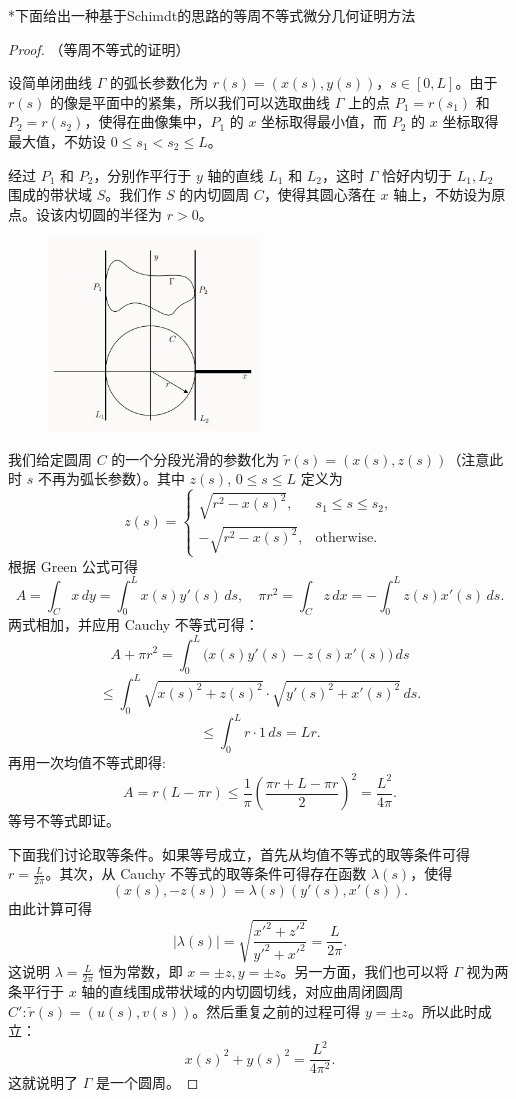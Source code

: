 \documentclass[12pt]{ctexart}
\begin{document}
\vspace{0.2cm}
\noindent **下面给出一种基于Schimdt的思路的等周不等式微分几何证明方法
\begin{proof}
（等周不等式的证明）

设简单闭曲线 $\Gamma$ 的弧长参数化为 $r(s) = (x(s), y(s))$，$s \in [0, L]$。由于 $r(s)$ 的像是平面中的紧集，所以我们可以选取曲线 $\Gamma$ 上的点 $P_1 = r(s_1)$ 和 $P_2 = r(s_2)$，使得在曲像集中，$P_1$ 的 $x$ 坐标取得最小值，而 $P_2$ 的 $x$ 坐标取得最大值，不妨设 $0 \leq s_1 < s_2 \leq L$。

经过 $P_1$ 和 $P_2$，分别作平行于 $y$ 轴的直线 $L_1$ 和 $L_2$，这时 $\Gamma$ 恰好内切于 $L_1, L_2$ 围成的带状域 $S$。我们作 $S$ 的内切圆周 $C$，使得其圆心落在 $x$ 轴上，不妨设为原点。设该内切圆的半径为 $r > 0$。
\begin{figure}[h!] %
    \centering %
    \includegraphics[width=0.5\textwidth]{part4.png} %
\end{figure}

我们给定圆周 $C$ 的一个分段光滑的参数化为 $\tilde{r}(s) = (x(s), z(s))$（注意此时 $s$ 不再为弧长参数）。其中 $z(s)$, $0 \leq s \leq L$ 定义为
\[
z(s) =
\begin{cases} 
    \sqrt{r^2 - x(s)^2}, & s_1 \leq s \leq s_2, \\
    -\sqrt{r^2 - x(s)^2}, & \text{otherwise}.
\end{cases}
\]
根据 Green 公式可得
\[
A = \int_C x \, dy = \int_0^L x(s) y'(s) \, ds, \quad \pi r^2 = \int_C z \, dx = -\int_0^L z(s) x'(s) \, ds.
\]
两式相加，并应用 Cauchy 不等式可得：
\[
A + \pi r^2 = \int_0^L \big( x(s) y'(s) - z(s) x'(s) \big) \, ds
\]
\[
\leq \int_0^L \sqrt{x(s)^2 + z(s)^2} \cdot \sqrt{y'(s)^2 + x'(s)^2} \, ds.
\]
\[
\leq \int_0^L r \cdot 1 \, ds = Lr.
\]
再用一次均值不等式即得:
\[
A = r(L - \pi r) \leq \frac{1}{\pi} \left( \frac{\pi r + L - \pi r}{2} \right)^2 = \frac{L^2}{4\pi}.
\]
等号不等式即证。

下面我们讨论取等条件。如果等号成立，首先从均值不等式的取等条件可得 $r = \frac{L}{2\pi}$。其次，从 Cauchy 不等式的取等条件可得存在函数 $\lambda(s)$，使得
\[
(x(s), -z(s)) = \lambda(s) (y'(s), x'(s)).
\]
由此计算可得
\[
|\lambda(s)| = \sqrt{\frac{x'^2 + z'^2}{y'^2 + x'^2}} = \frac{L}{2\pi}.
\]
这说明 $\lambda = \frac{L}{2\pi}$ 恒为常数，即 $x = \pm z, y = \pm z$。另一方面，我们也可以将 $\Gamma$ 视为两条平行于 $x$ 轴的直线围成带状域的内切圆切线，对应曲周闭圆周 $C': \tilde{r}(s) = (u(s), v(s))$。然后重复之前的过程可得 $y = \pm z$。\cite{key6}所以此时成立：
\[
x(s)^2 + y(s)^2 = \frac{L^2}{4\pi^2}.
\]
这就说明了 $\Gamma$ 是一个圆周。
\end{proof}
\end{document}
